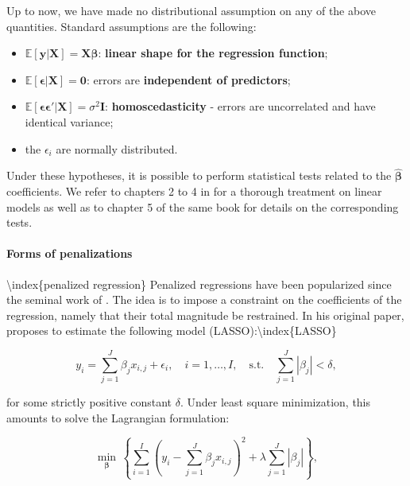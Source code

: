 Up to now, we have made no distributional assumption on any of the above quantities. Standard assumptions are the following:

\begin{itemize}
\item $\mathbb{E}[\textbf{y}|\textbf{X}]=\textbf{X}\boldsymbol{\beta}$: \textbf{linear shape for the regression function};
\item $\mathbb{E}[\boldsymbol{\epsilon}|\textbf{X}]=\textbf{0}$: errors are \textbf{independent of predictors};
\item $\mathbb{E}[\boldsymbol{\epsilon}\boldsymbol{\epsilon}'| \textbf{X}]=\sigma^2\textbf{I}$: \textbf{homoscedasticity} - errors are uncorrelated and have identical variance;
\item the $\epsilon_i$ are normally distributed.
\end{itemize}

Under these hypotheses, it is possible to perform statistical tests related to the $\hat{\boldsymbol{\beta}}$ coefficients. We refer to chapters 2 to 4 in \cite{greene2018econometric} for a thorough treatment on linear models as well as to chapter 5 of the same book for details on the corresponding tests.

\paragraph{Forms of penalizations}

{\textbackslash}index\{penalized regression\}
Penalized regressions have been popularized since the seminal work of \cite{tibshirani1996regression}. The idea is to impose a constraint on the coefficients of the regression, namely that their total magnitude be restrained. In his original paper, \cite{tibshirani1996regression} proposes to estimate the following model (LASSO):{\textbackslash}index\{LASSO\}

\begin{equation}
\label{lasso1}
y_i = \sum_{j=1}^J \beta_jx_{i,j} + \epsilon_i, \quad i =1,\dots,I, \quad \text{s.t.} \quad \sum_{j=1}^J |\beta_j| < \delta,
\end{equation}

for some strictly positive constant $\delta$. Under least square minimization, this amounts to solve the Lagrangian formulation:

\begin{equation}
\label{lasso2}
\underset{\mathbf{\beta}}{\min} \, \left\{ \sum_{i=1}^I\left(y_i - \sum_{j=1}^J \beta_jx_{i,j} \right)^2+\lambda \sum_{j=1}^J |\beta_j| \right\},
\end{equation}

